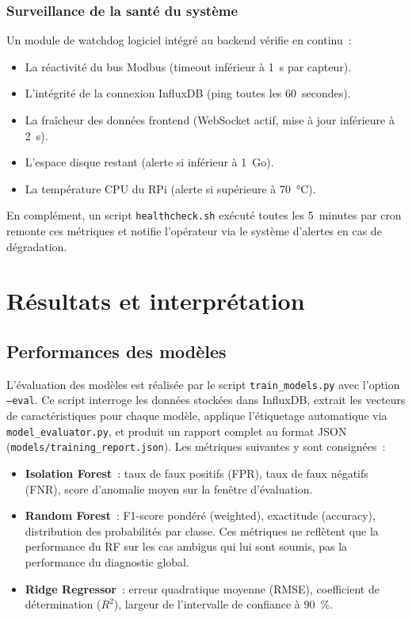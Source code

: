 \subsubsection{Surveillance de la santé du système}

Un module de watchdog logiciel intégré au backend vérifie en continu~:

\begin{itemize}
  \item La réactivité du bus Modbus (timeout inférieur à 1~s par capteur).
  \item L'intégrité de la connexion InfluxDB (ping toutes les 60~secondes).
  \item La fraîcheur des données frontend (WebSocket actif, mise à jour inférieure à 2~s).
  \item L'espace disque restant (alerte si inférieur à 1~Go).
  \item La température CPU du RPi (alerte si supérieure à 70~\si{\celsius}).
\end{itemize}

En complément, un script \texttt{healthcheck.sh} exécuté toutes les 5~minutes par cron remonte ces métriques et notifie l'opérateur via le système d'alertes en cas de dégradation.

\section{Résultats et interprétation}

\subsection{Performances des modèles}

L'évaluation des modèles est réalisée par le script \texttt{train\_models.py} avec l'option \texttt{--eval}. Ce script interroge les données stockées dans InfluxDB, extrait les vecteurs de caractéristiques pour chaque modèle, applique l'étiquetage automatique via \texttt{model\_evaluator.py}, et produit un rapport complet au format JSON (\texttt{models/training\_report.json}). Les métriques suivantes y sont consignées~:

\begin{itemize}
  \item \textbf{Isolation Forest}~: taux de faux positifs (FPR), taux de faux négatifs (FNR), score d'anomalie moyen sur la fenêtre d'évaluation.
  \item \textbf{Random Forest}~: F1-score pondéré (weighted), exactitude (accuracy), distribution des probabilités par classe. Ces métriques ne reflètent que la performance du RF sur les cas ambigus qui lui sont soumis, pas la performance du diagnostic global.
  \item \textbf{Ridge Regressor}~: erreur quadratique moyenne (RMSE), coefficient de détermination (\(R^2\)), largeur de l'intervalle de confiance à 90~\%.
\end{itemize}

